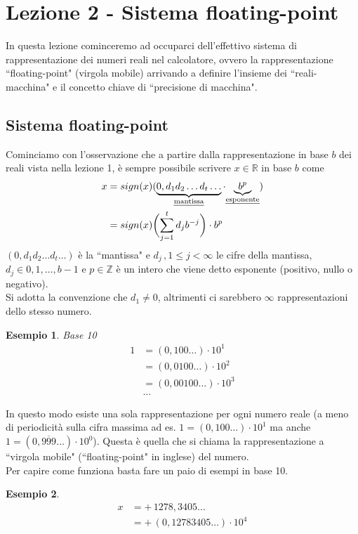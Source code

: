 \documentclass[12pt]{article}
\newtheorem*{esempio}{Esempio}
\begin{document}
\section{Lezione 2 - Sistema floating-point}
In questa lezione cominceremo ad occuparci dell'effettivo sistema di rappresentazione dei numeri reali nel calcolatore, ovvero la rappresentazione ``floating-point" (virgola mobile) arrivando a definire l'insieme dei ``reali-macchina" e il concetto chiave di ``precisione di macchina".

\subsection{Sistema floating-point}
Cominciamo con l'osservazione che a partire dalla rappresentazione in base $b$ dei reali vista nella lezione 1, è sempre possibile scrivere $x \in \mathbb{R}$ in base $b$ come 
\[ \begin{split}
    x & = sign(x)( \underbrace{0,d_1 d_2 \dotsc d_t \dotsc}_{\text {\uline{mantissa}}} \cdot {\underbrace{b^p}_{\text{\uline{esponente}}}}) \\
    & = sign(x)\biggl( \sum_{j=1}^t d_j b^{-j} \biggr) \cdot b^p
\end{split} \]
$(0,d_1 d_2 \dotsc d_t \dotsc)$ è la ``mantissa" e $d_j\, , 1 \le j < \infty$ le cifre della mantissa, $d_j \in {0, 1, \dotsc , b-1}$ e $p \in \mathbb{Z}$ è un intero che viene detto esponente (positivo, nullo o negativo). \\
Si adotta la convenzione che $d_1 \ne 0$, altrimenti ci sarebbero $\infty$ rappresentazioni dello stesso numero.
\begin{esempio}
Base 10
\[ \begin{split}
    1 & = (0,100 \dotsc) \cdot 10^1 \\
    & = (0,0100 \dotsc) \cdot 10^2 \\
    & = (0,00100 \dotsc) \cdot 10^3 \\
    & \dotsc
\end{split}\]
\end{esempio}
In questo modo esiste una sola rappresentazione per ogni numero reale (a meno di periodicità sulla cifra massima ad es. $1 = (0,100 \dotsc) \cdot 10^1$ ma anche $1 = (0,\overline{999} \dotsc) \cdot 10^0$). Questa è quella che si chiama la rappresentazione a ``virgola mobile" (``floating-point" in inglese) del numero. \\
Per capire come funziona basta fare un paio di esempi in base 10.
\begin{esempio}
\[\begin{split}
    x & = + \, 1278,3405 \dotsc \\
    & = + \, (0,12783405 \dotsc) \cdot 10^4 
\end{split}\]
\end{esempio}
\end{document}
